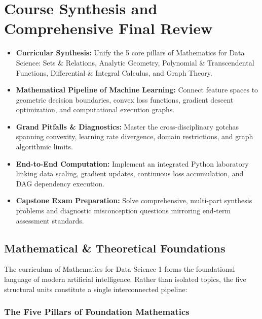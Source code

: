 \chapter{Course Synthesis and Comprehensive Final Review}

\begin{tcolorbox}[colback=primarylight, colframe=primarydark, title={\textbf{Executive Roadmap \& Learning Objectives}}]
\begin{itemize}
    \item \textbf{Curricular Synthesis:} Unify the 5 core pillars of Mathematics for Data Science: Sets \& Relations, Analytic Geometry, Polynomial \& Transcendental Functions, Differential \& Integral Calculus, and Graph Theory.
    \item \textbf{Mathematical Pipeline of Machine Learning:} Connect feature spaces to geometric decision boundaries, convex loss functions, gradient descent optimization, and computational execution graphs.
    \item \textbf{Grand Pitfalls \& Diagnostics:} Master the cross-disciplinary gotchas spanning convexity, learning rate divergence, domain restrictions, and graph algorithmic limits.
    \item \textbf{End-to-End Computation:} Implement an integrated Python laboratory linking data scaling, gradient updates, continuous loss accumulation, and DAG dependency execution.
    \item \textbf{Capstone Exam Preparation:} Solve comprehensive, multi-part synthesis problems and diagnostic misconception questions mirroring end-term assessment standards.
\end{itemize}
\end{tcolorbox}

\section{Mathematical \& Theoretical Foundations}

The curriculum of Mathematics for Data Science 1 forms the foundational language of modern artificial intelligence. Rather than isolated topics, the five structural units constitute a single interconnected pipeline:

\subsection{The Five Pillars of Foundation Mathematics}

